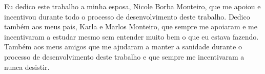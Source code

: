 
Eu dedico este trabalho a minha esposa, Nicole Borba Monteiro, que me apoiou e incentivou durante todo o processo de desenvolvimento deste trabalho.
Dedico também aos meus pais, Karla e Marlos Monteiro, que sempre me apoiaram e me incentivaram a estudar mesmo sem entender muito bem o que eu estava fazendo.
Também aos meus amigos que me ajudaram a manter a sanidade durante o processo de desenvolvimento deste trabalho e que sempre me incentivaram a nunca desistir.
